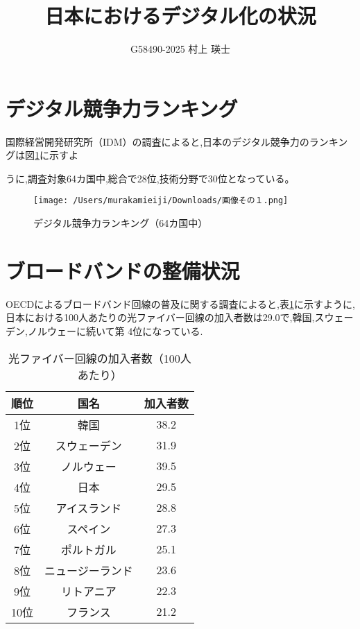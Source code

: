 \documentclass[a4paper,11pt,dvipdfmx]{ujarticle}
\title{日本におけるデジタル化の状況}
\author{G58490-2025 村上 瑛士}
\begin{document}
\maketitle %

\section{デジタル競争力ランキング}

国際経営開発研究所（IDM）の調査\cite{imd}によると,日本のデジタル競争力のランキングは図\ref{fig.競争力}に示すよ

うに,調査対象64カ国中,総合で28位,技術分野で30位となっている。

\begin{figure}[htbp]
    \centering
    \texttt{[image: /Users/murakamieiji/Downloads/画像その１.png]}
    \caption{デジタル競争力ランキング（64カ国中）}\label{fig.競争力}
\end{figure}








\section{ブロードバンドの整備状況}

OECDによるブロードバンド回線の普及に関する調査\cite{oecd}によると,表\ref{tbl.利用者数}に示すように,日本における100人あたりの光ファイバー回線の加入者数は29.0で,韓国,スウェーデン,ノルウェーに続いて第
4位になっている.

\begin{table}[htbp]
    \centering
    \caption{光ファイバー回線の加入者数（100人あたり）}
    \label{tbl.利用者数}

    \begin{tabular}{|c|c|c|}\hline
        順位 & 国名 & 加入者数 \\
        \hline
        1位 & 韓国 & 38.2 \\
        \hline
        2位 & スウェーデン & 31.9 \\
        \hline
        3位 & ノルウェー & 39.5 \\
        \hline
        4位 & 日本 & 29.5 \\
        \hline
        5位 & アイスランド & 28.8 \\
        \hline
        6位 & スペイン & 27.3 \\
        \hline
        7位 & ポルトガル & 25.1 \\
        \hline
        8位 & ニュージーランド & 23.6 \\
        \hline
        9位 & リトアニア & 22.3 \\
        \hline
        10位 & フランス & 21.2 \\
        \hline
    \end{tabular}
\end{table}
\end{document}
